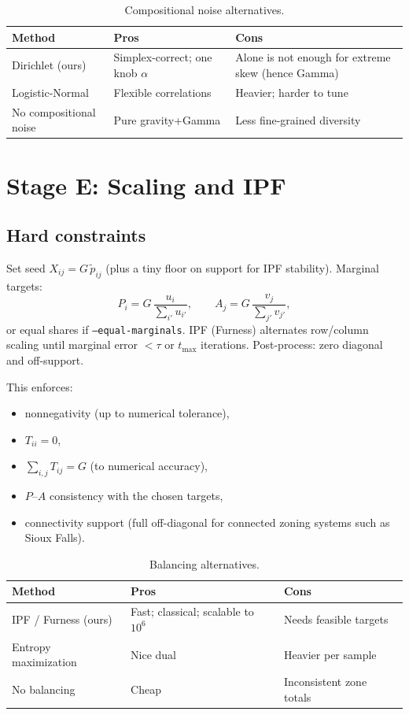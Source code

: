 \documentclass[11pt,a4paper]{report}
\begin{document}
\begin{table}[ht]
\centering
\caption{Compositional noise alternatives.}
\label{tab:fp-dir-pros}
\small
\begin{tabular}{@{}p{3.2cm}p{5.1cm}p{5.1cm}@{}}
\toprule
\textbf{Method} & \textbf{Pros} & \textbf{Cons} \\
\midrule
Dirichlet (ours) &
Simplex-correct; one knob $\alpha$ &
Alone is not enough for extreme skew (hence Gamma) \\
Logistic-Normal &
Flexible correlations &
Heavier; harder to tune \\
No compositional noise &
Pure gravity+Gamma &
Less fine-grained diversity \\
\bottomrule
\end{tabular}
\end{table}


\chapter{Stage E: Scaling and IPF}
\label{ch:fp-ipf}

\section{Hard constraints}

Set seed $X_{ij}=G\,\tilde{p}_{ij}$ (plus a tiny floor on support for IPF stability). Marginal targets:
\begin{equation}
  P_i = G\,\frac{u_i}{\sum_{i'}u_{i'}}, \qquad
  A_j = G\,\frac{v_j}{\sum_{j'}v_{j'}},
\end{equation}
or equal shares if \texttt{--equal-marginals}. IPF (Furness) alternates row/column scaling until marginal error $<\tau$ or $t_{\max}$ iterations. Post-process: zero diagonal and off-support.

This enforces:
\begin{itemize}[nosep]
    \item nonnegativity (up to numerical tolerance),
    \item $T_{ii}=0$,
    \item $\sum_{i,j}T_{ij}=G$ (to numerical accuracy),
    \item $P$--$A$ consistency with the chosen targets,
    \item connectivity support (full off-diagonal for connected zoning systems such as Sioux Falls).
\end{itemize}

\begin{table}[ht]
\centering
\caption{Balancing alternatives.}
\label{tab:fp-ipf-pros}
\small
\begin{tabular}{@{}p{3.2cm}p{5.1cm}p{5.1cm}@{}}
\toprule
\textbf{Method} & \textbf{Pros} & \textbf{Cons} \\
\midrule
IPF / Furness (ours) &
Fast; classical; scalable to $10^6$ &
Needs feasible targets \\
Entropy maximization &
Nice dual &
Heavier per sample \\
No balancing &
Cheap &
Inconsistent zone totals \\
\bottomrule
\end{tabular}
\end{table}
\end{document}
